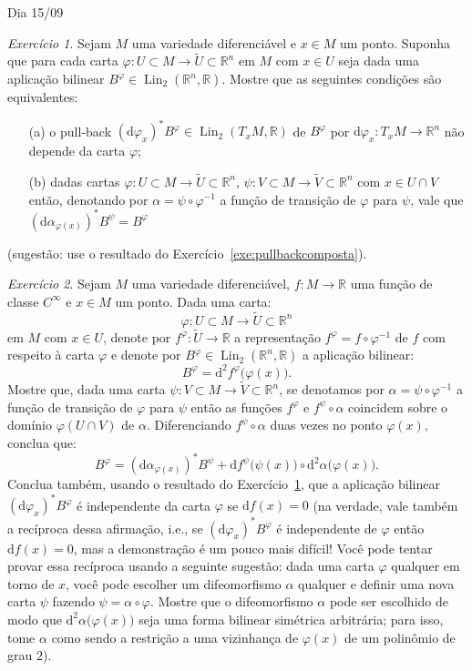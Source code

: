 \documentclass[oneside,11pt]{amsart}
\newcommand{\R}{\mathds R}
\newcommand{\dd}{\mathrm d}
\DeclareMathOperator{\Lin}{Lin}
\theoremstyle{remark}\newtheorem{exercise}{Exercício}[section]
\theoremstyle{plain}\newtheorem{teo}{Teorema}[section]
\theoremstyle{plain}\newtheorem{lem}[teo]{Lema}
\theoremstyle{plain}\newtheorem{prop}[teo]{Proposição}
\theoremstyle{definition}\newtheorem{defin}[teo]{Definição}
\theoremstyle{remark}\newtheorem{rem}[teo]{Observação}
\theoremstyle{definition}\newtheorem{example}[teo]{Exemplo}
\numberwithin{equation}{section}
\begin{document}
\begin{section}{Dia 15/09}

\begin{exercise}\label{exe:bilintang}
Sejam $M$ uma variedade diferenciável e $x\in M$ um ponto. Suponha que para cada carta $\varphi:U\subset M\to\widetilde U\subset\R^n$ em $M$
com $x\in U$ seja dada uma aplicação bilinear $B^\varphi\in\Lin_2(\R^n,\R)$. Mostre que as seguintes condições são equivalentes:
\begin{itemize}
\item[(a)] o pull-back $(\dd\varphi_x)^*B^\varphi\in\Lin_2(T_xM,\R)$ de $B^\varphi$ por $\dd\varphi_x:T_xM\to\R^n$ não depende da carta $\varphi$;
\item[(b)] dadas cartas $\varphi:U\subset M\to\widetilde U\subset\R^n$, $\psi:V\subset M\to\widetilde V\subset\R^n$ com $x\in U\cap V$ então,
denotando por $\alpha=\psi\circ\varphi^{-1}$ a função de transição de $\varphi$ para $\psi$, vale que $(\dd\alpha_{\varphi(x)})^*B^\psi=B^\varphi$
\end{itemize}
(sugestão: use o resultado do Exercício~\ref{exe:pullbackcomposta}).
\end{exercise}

\begin{exercise}\label{exe:Hessf}
Sejam $M$ uma variedade diferenciável, $f:M\to\R$ uma função de classe $C^\infty$ e $x\in M$ um ponto. Dada uma carta:
\[\varphi:U\subset M\longrightarrow\widetilde U\subset\R^n\]
em $M$ com $x\in U$, denote por $f^\varphi:\widetilde U\to\R$ a representação $f^\varphi=f\circ\varphi^{-1}$ de $f$ com respeito à carta $\varphi$
e denote por $B^\varphi\in\Lin_2(\R^n,\R)$ a aplicação bilinear:
\[B^\varphi=\dd^2f^\varphi\big(\varphi(x)\big).\]
Mostre que, dada uma carta $\psi:V\subset M\to\widetilde V\subset\R^n$, se denotamos por $\alpha=\psi\circ\varphi^{-1}$ a função de transição
de $\varphi$ para $\psi$ então
as funções $f^\varphi$ e $f^\psi\circ\alpha$ coincidem sobre o domínio $\varphi(U\cap V)$ de $\alpha$. Diferenciando $f^\psi\circ\alpha$
duas vezes no ponto $\varphi(x)$, conclua que:
\[B^\varphi=(\dd\alpha_{\varphi(x)})^*B^\psi+\dd f^\psi\big(\psi(x)\big)\circ\dd^2\alpha\big(\varphi(x)\big).\]
Conclua também, usando o resultado do Exercício~\ref{exe:bilintang}, que a aplicação bilinear $(\dd\varphi_x)^*B^\varphi$ é independente da carta $\varphi$ se
$\dd f(x)=0$ (na verdade, vale também a recíproca dessa afirmação,
i.e., se $(\dd\varphi_x)^*B^\varphi$ é independente de $\varphi$ então $\dd f(x)=0$, mas a demonstração
é um pouco mais difícil! Você pode tentar provar essa recíproca usando a seguinte sugestão: dada uma carta $\varphi$ qualquer em torno de $x$, você pode escolher um
difeomorfismo $\alpha$ qualquer e definir uma nova carta $\psi$ fazendo $\psi=\alpha\circ\varphi$. Mostre que o difeomorfismo $\alpha$ pode ser escolhido
de modo que $\dd^2\alpha\big(\varphi(x)\big)$ seja uma forma bilinear simétrica arbitrária; para isso, tome $\alpha$ como sendo a restrição a uma vizinhança
de $\varphi(x)$ de um polinômio de grau $2$).
\end{exercise}


\end{section}
\end{document}
